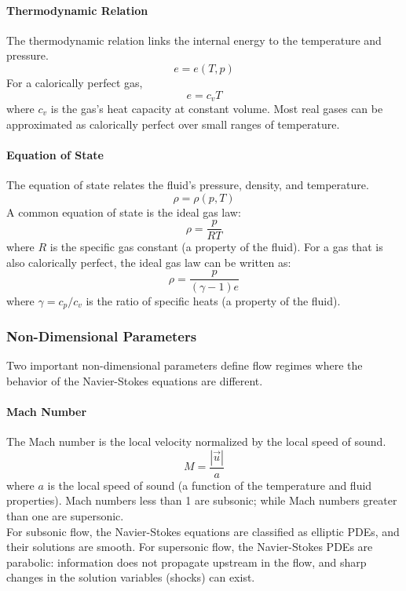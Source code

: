 \documentclass[paper=a4, fontsize=11pt]{scrartcl}
\numberwithin{equation}{section}        %
\numberwithin{figure}{section}          %
\numberwithin{table}{section}               %
\begin{document}
\paragraph{Thermodynamic Relation}
The thermodynamic relation links the internal energy to the temperature and pressure.
\begin{equation}
    \label{eqn:ns_thermo}
    e = e(T, p)
\end{equation}
For a calorically perfect gas,
\begin{equation}
    e = c_v T
\end{equation}
where $c_v$ is the gas's heat capacity at constant volume. Most real gases can be approximated as calorically perfect over small ranges of temperature.

\paragraph{Equation of State}
The equation of state relates the fluid's pressure, density, and temperature.
\begin{equation}
    \label{eqn:ns_state}
    \rho = \rho(p, T)
\end{equation}
A common equation of state is the ideal gas law:
\begin{equation}
    \rho = \frac{p}{R T}
\end{equation}
where $R$ is the specific gas constant (a property of the fluid). For a gas that is also calorically perfect, the ideal gas law can be written as:
\begin{equation}
    \label{eqn:prhoe}
    \rho = \frac{p}{(\gamma - 1) e}
\end{equation}
where $\gamma = c_p / c_v$ is the ratio of specific heats (a property of the fluid).

\subsubsection{Non-Dimensional Parameters}
Two important non-dimensional parameters define flow regimes where the behavior of the Navier-Stokes equations are different.

\paragraph{Mach Number}
The Mach number is the local velocity normalized by the local speed of sound.
\begin{equation}
    M = \frac{|\vec{u}|}{a}
\end{equation}
where $a$ is the local speed of sound (a function of the temperature and fluid properties). Mach numbers less than 1 are subsonic; while Mach numbers greater than one are supersonic.\\
For subsonic flow, the Navier-Stokes equations are classified as elliptic PDEs, and their solutions are smooth. For supersonic flow, the Navier-Stokes PDEs are parabolic: information does not propagate upstream in the flow, and sharp changes in the solution variables (shocks) can exist.
\end{document}
